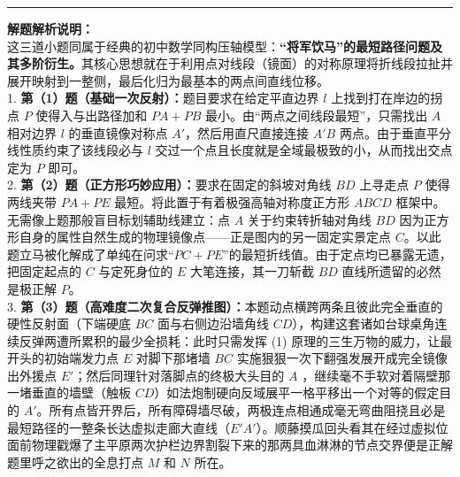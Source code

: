 \vspace{0.6cm}
\hrule
\vspace{0.4cm}

{\small\color{gray}
\textbf{解题解析说明：}\\
这三道小题同属于经典的初中数学同构压轴模型：\textbf{“将军饮马”的最短路径问题及其多阶衍生。}其核心思想就在于利用点对线段（镜面）的对称原理将折线段拉扯并展开映射到一整侧，最后化归为最基本的两点间直线位移。\\
1. \textbf{第（1）题（基础一次反射）：}题目要求在给定平直边界 $l$ 上找到打在岸边的拐点 $P$ 使得入与出路径加和 $PA+PB$ 最小。由“两点之间线段最短”，只需找出 $A$ 相对边界 $l$ 的垂直镜像对称点 $A'$，然后用直尺直接连接 $A'B$ 两点。由于垂直平分线性质约束了该线段必与 $l$ 交过一个点且长度就是全域最极致的小，从而找出交点定为 $P$ 即可。\\
2. \textbf{第（2）题（正方形巧妙应用）：}要求在固定的斜坡对角线 $BD$ 上寻走点 $P$ 使得两线夹带 $PA+PE$ 最短。将此置于有着极强高轴对称度正方形 $ABCD$ 框架中。无需像上题那般盲目标划辅助线建立：点 $A$ 关于约束转折轴对角线 $BD$ 因为正方形自身的属性自然生成的物理镜像点——正是图内的另一固定实景定点 $C$。以此题立马被化解成了单纯在问求“$PC+PE$”的最短折线值。由于定点均已暴露无遗，把固定起点的 $C$ 与定死身位的 $E$ 大笔连接，其一刀斩截 $BD$ 直线所遗留的必然是极正解 $P$。\\
3. \textbf{第（3）题（高难度二次复合反弹推图）：}本题动点横跨两条且彼此完全垂直的硬性反射面（下端硬底 $BC$ 面与右侧边沿墙角线 $CD$），构建这套诸如台球桌角连续反弹两遭所累积的最少全损耗：此时只需发挥 (1) 原理的三生万物的威力，让最开头的初始端发力点 $E$ 对脚下那堵墙 $BC$ 实施狠狠一次下翻强发展开成完全镜像出外援点 $E'$；然后同理针对落脚点的终极大头目的 $A$ ，继续毫不手软对着隔壁那一堵垂直的墙壁（触板 $CD$）如法炮制硬向反域展平一格平移出一个对等的假定目的 $A'$。所有点皆开界后，所有障碍墙尽破，两极连点相通成毫无弯曲阻挠且必是最短路径的一整条长达虚拟走廊大直线（$E'A'$）。顺藤摸瓜回头看其在经过虚拟位面前物理戳爆了主平原两次护栏边界割裂下来的那两具血淋淋的节点交界便是正解题里呼之欲出的全息打点 $M$ 和 $N$ 所在。
}

\vspace{0.6cm}

